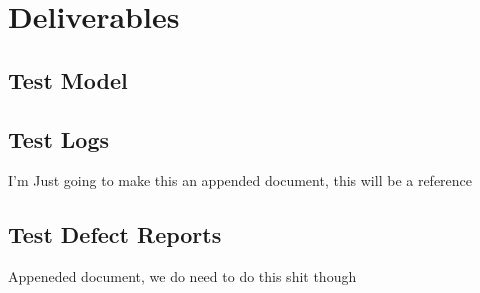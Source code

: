 
\chapter{Deliverables} %

\label{Part9Chapter6} %



\section{Test Model}



\section{Test Logs}

I'm Just going to make this an appended document, this will be a reference



\section{Test Defect Reports}

	Appeneded document, we do need to do this shit though